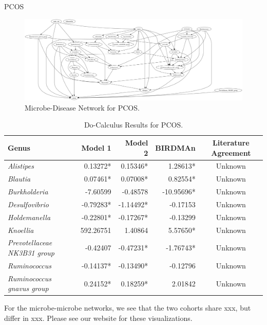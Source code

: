 \documentclass[final]{beamer}
\newlength{\colwidth}
\begin{document}
\begin{frame}[t]
\begin{columns}[t]
\begin{column}{\colwidth}
\begin{block}{PCOS}
    \begin{figure}
      \centering
      \includegraphics[width=\linewidth]{../graphs/pcos/cdnod_norm.png}
      \caption{Microbe-Disease Network for PCOS.}
    \end{figure}
    
    \begin{table}
      \centering
      \begin{tabular}{l r r r c}
        \toprule
        \textbf{Genus} & \textbf{Model 1} & \textbf{Model 2} & \textbf{BIRDMAn} & \textbf{Literature Agreement} \\
        \midrule
        \textit{Alistipes} & 0.13272* & 0.15346* & 1.28613* & Unknown \\
        \textit{Blautia} & 0.07461* & 0.07008* & 0.82554* & Unknown \\
        \textit{Burkholderia} & -7.60599 & -0.48578 & -10.95696* & Unknown \\
        \textit{Desulfovibrio} & -0.79283* & -1.14492* & -0.17153 & Unknown \\
        \textit{Holdemanella} & -0.22801* & -0.17267* & -0.13299 & Unknown \\
        \textit{Knoellia} & 592.26751 & 1.40864 & 5.57650* & Unknown \\
        \textit{Prevotellaceae NK3B31 group} & -0.42407 & -0.47231* & -1.76743* & Unknown \\
        \textit{Ruminococcus} & -0.14137* & -0.13490* & -0.12796 & Unknown \\
        \textit{Ruminococcus gnavus group} & 0.24152* & 0.18259* & 2.01842 & Unknown \\
        \bottomrule
      \end{tabular}
      \caption{Do-Calculus Results for PCOS.}
    \end{table}
    
    For the microbe-microbe networks, we see that the two cohorts share xxx, but differ in xxx. Please see our website for these visualizations. \\


\end{block}
\end{column}
\end{columns}
\end{frame}
\end{document}
